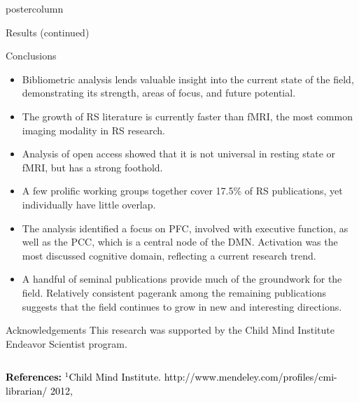 \documentclass[final,hyperref={pdfpagelabels=false}]{beamer}
\begin{document}
\begin{frame}
\begin{columns}
\begin{column}{.5\textwidth}
\begin{beamercolorbox}[center,wd=\textwidth]{postercolumn}
\begin{minipage}[T]{.96\textwidth}
{\begin{block}{Results (continued)}
            \end{block}
            \begin{block}{Conclusions}
              \begin{itemize}
                  \item Bibliometric analysis lends valuable insight into the current state of the field, demonstrating its strength, areas of focus, and future potential. 
                  \item The growth of RS literature is currently faster than fMRI, the most common imaging modality in RS research. 
                  \item Analysis of open access showed that it is not universal in resting state or fMRI, but has a strong foothold.                   
                  \item A few prolific working groups together cover 17.5\% of RS publications, yet individually have little overlap.
                  \item The analysis identified a focus on PFC, involved with executive function, as well as the PCC, which is a central node of the DMN.  Activation was the most discussed cognitive domain, reflecting a current research trend. 
                  \item A handful of seminal publications provide much of the groundwork for the field. Relatively consistent pagerank among the remaining publications suggests that the field continues to grow in new and interesting directions.
                  \end{itemize}
            \end{block}
            \begin{block}{Acknowledgements}
            This research was supported by the Child Mind Institute Endeavor Scientist program.
            \end{block}
          }
        \end{minipage}
      \end{beamercolorbox}
    \end{column}
  \end{columns}
  \small\textcolor{black}{{\bf References:} 
$^1$Child Mind Institute. http://www.mendeley.com/profiles/cmi-librarian/ 2012,
}
\end{frame}
\end{document}
